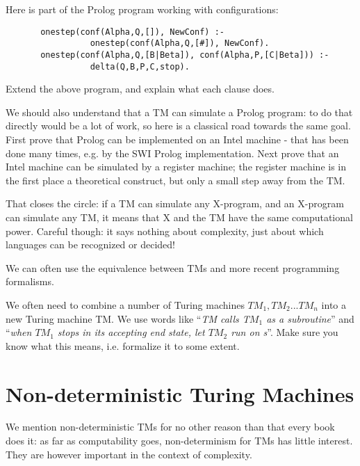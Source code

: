Here is part of the Prolog program working with configurations:

\begin{verbatim}
       onestep(conf(Alpha,Q,[]), NewConf) :-
                 onestep(conf(Alpha,Q,[#]), NewConf).
       onestep(conf(Alpha,Q,[B|Beta]), conf(Alpha,P,[C|Beta])) :-
                 delta(Q,B,P,C,stop).
\end{verbatim}

\begin{exercise}
Extend the above program, and explain what each clause does.
\end{exercise}

We should also understand that a TM can simulate a Prolog program: to
do that directly would be a lot of work, so here is a classical road
towards the same goal. First prove that Prolog can be implemented on
an Intel machine - that has been done many times, e.g. by the SWI
Prolog implementation. Next prove that an Intel machine can be
simulated by a register machine; the register machine is in the first
place a theoretical construct, but only a small step away from the TM.

That closes the circle: if a TM can simulate any X-program, and an
X-program can simulate any TM, it means that X and the TM have the
same computational power. Careful though: it says nothing about
complexity, just about which languages can be recognized or decided!

We can often use the equivalence between TMs and more recent
programming formalisms.


\begin{exercise}
We often need to combine a number of Turing machines $TM_1, TM_2
... TM_n$ into a new Turing machine TM. We use words like ``{\em TM calls T$M_1$ as a subroutine}'' and ``{\em when $TM_1$ stops in its accepting end state,
let $TM_2$ run on s}''. Make sure you know what this means, i.e. formalize it to some extent.
\end{exercise}




\section{Non-deterministic Turing Machines}

We mention non-deterministic TMs for no other reason than that every
book does it: as far as computability goes, non-determinism for TMs
has little interest. They are however important in the context of
complexity.

